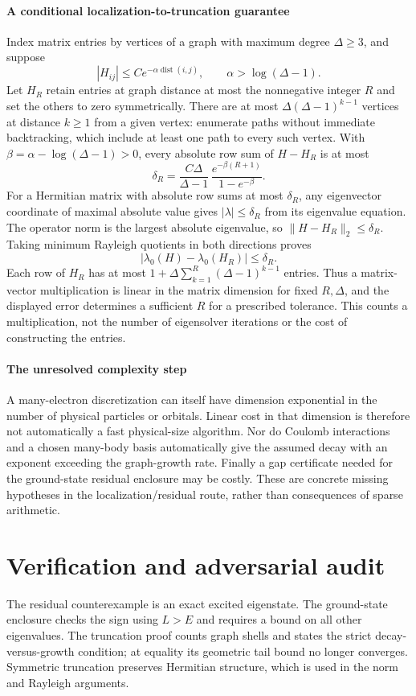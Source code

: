 \documentclass[11pt]{article}
\begin{document}
\paragraph{A conditional localization-to-truncation guarantee}
Index matrix entries by vertices of a graph with maximum degree $\Delta\geq3$, and suppose
\[
 |H_{ij}|\leq C e^{-\alpha\operatorname{dist}(i,j)},\qquad
 \alpha>\log(\Delta-1).
\]
Let $H_R$ retain entries at graph distance at most the nonnegative integer $R$ and set the others to zero symmetrically. There are at most $\Delta(\Delta-1)^{k-1}$ vertices at distance $k\geq1$ from a given vertex: enumerate paths without immediate backtracking, which include at least one path to every such vertex. With $\beta=\alpha-\log(\Delta-1)>0$, every absolute row sum of $H-H_R$ is at most
\[
 \delta_R=\frac{C\Delta}{\Delta-1}\,
       \frac{e^{-\beta(R+1)}}{1-e^{-\beta}}.
\]
For a Hermitian matrix with absolute row sums at most $\delta_R$, any eigenvector coordinate of maximal absolute value gives $|\lambda|\leq\delta_R$ from its eigenvalue equation. The operator norm is the largest absolute eigenvalue, so $\lVert H-H_R\rVert_2\leq\delta_R$. Taking minimum Rayleigh quotients in both directions proves
\[
 |\lambda_0(H)-\lambda_0(H_R)|\leq\delta_R.
\]
Each row of $H_R$ has at most $1+\Delta\sum_{k=1}^R(\Delta-1)^{k-1}$ entries. Thus a matrix-vector multiplication is linear in the matrix dimension for fixed $R,\Delta$, and the displayed error determines a sufficient $R$ for a prescribed tolerance. This counts a multiplication, not the number of eigensolver iterations or the cost of constructing the entries.

\paragraph{The unresolved complexity step}
A many-electron discretization can itself have dimension exponential in the number of physical particles or orbitals. Linear cost in that dimension is therefore not automatically a fast physical-size algorithm. Nor do Coulomb interactions and a chosen many-body basis automatically give the assumed decay with an exponent exceeding the graph-growth rate. Finally a gap certificate needed for the ground-state residual enclosure may be costly. These are concrete missing hypotheses in the localization/residual route, rather than consequences of sparse arithmetic.

\section{Verification and adversarial audit}
The residual counterexample is an exact excited eigenstate. The ground-state enclosure checks the sign using $L>E$ and requires a bound on all other eigenvalues. The truncation proof counts graph shells and states the strict decay-versus-growth condition; at equality its geometric tail bound no longer converges. Symmetric truncation preserves Hermitian structure, which is used in the norm and Rayleigh arguments.
\end{document}
